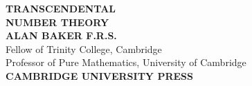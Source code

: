 \documentclass{qbook}
\begin{document}
\begin{sloppypar}	
	\pagestyle{empty}
	
	\begin{center}
		\vspace*{5cm}
		{\Huge\sffamily\bfseries TRANSCENDENTAL \\ NUMBER THEORY} \\
		\vspace{2em}
		{\Large\sffamily\bfseries ALAN BAKER F.R.S.} \\
		\vspace{1em}
		{\small Fellow of Trinity College, Cambridge \\ Professor of Pure Mathematics, University of Cambridge} \\
		\vfill
		{\large\sffamily\bfseries CAMBRIDGE UNIVERSITY PRESS}
	\end{center} 
	\thispagestyle{empty}
	\cleardoublepage

	\frontmatter
	\pagestyle{empty}
	
	
	
	\tableofcontents
	\cleardoublepage
	
	\mainmatter
	\pagestyle{fancy}
	
	
	
	
	
	
	
	
	
	
	
	
	
	
	\renewcommand{\bibname}{Bibliography}
	\cleardoublepage
	
	
	

\end{sloppypar}
\end{document}
